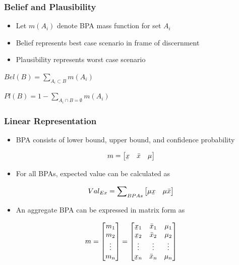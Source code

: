 \documentclass{beamer}
\newcommand{\ubar}[1]{\underaccent{\bar}{#1}}
\begin{document}
\begin{frame}
\frametitle{Belief and Plausibility}
\begin{itemize}
\item{Let $m(A_i)$ denote BPA mass function for set $A_i$}
\item{Belief represents best case scenario in frame of discernment}
\item{Plausibility represents worst case scenario}
\end{itemize}
\begin{theorem}[Belief of B]
{$Bel(B) = \sum\nolimits_{A_i \subset B} m(A_i)$}
\end{theorem}
\begin{theorem}[Plausibility of B]
{$Pl(B) = 1 - \sum\nolimits_{A_i \cap B = \emptyset} m(A_i)$}
\end{theorem}
\end{frame}

\begin{frame}
\frametitle{Linear Representation}
\begin{itemize}
\item{BPA consists of lower bound, upper bound, and confidence probability}
\end{itemize}
\begin{equation}
m = \begin{bmatrix*}
\ubar{x} & \bar{x} & \mu \end{bmatrix*}
\end{equation}
\begin{itemize}
\item{For all BPAs, expected value can be calculated as}
\end{itemize}
\begin{equation}
Val_{Ex} = \sum\nolimits_{BPAs} 
\begin{bmatrix*} \mu \ubar{x} & \mu \bar{x} \end{bmatrix*}
\end{equation}
\begin{itemize}
\item{An aggregate BPA can be expressed in matrix form as}
\end{itemize}
\begin{equation}
m = \begin{bmatrix*}
m_1 \\
m_2 \\
\vdots \\
m_n \end{bmatrix*}
= \begin{bmatrix*}
\ubar{x}_1 & \bar{x}_1 & \mu_1 \\
\ubar{x}_2 & \bar{x}_2 & \mu_2 \\
\vdots & \vdots & \vdots \\
\ubar{x}_n & \bar{x}_n & \mu_n \\ \end{bmatrix*}
\end{equation}
\end{frame}
\end{document}
